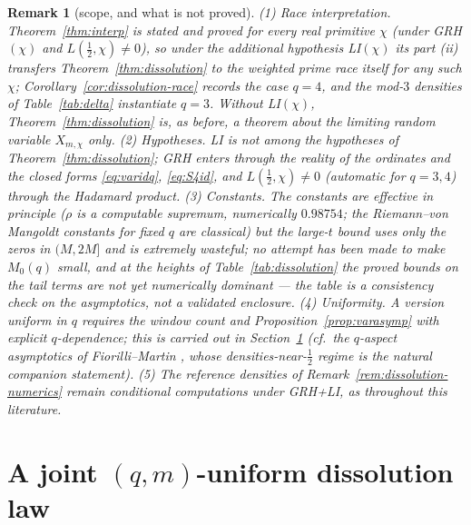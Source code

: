 \documentclass[11pt]{article}
\newtheorem{remark}{Remark}
\begin{document}
\begin{remark}[scope, and what is not proved]\label{rem:dissolution-scope}
(1) \emph{Race interpretation.} Theorem~\ref{thm:interp} is stated
and proved for every real primitive $\chi$ (under GRH$(\chi)$ and
$L(\tfrac12,\chi)\ne0$), so under the additional hypothesis LI$(\chi)$
its part (ii) transfers Theorem~\ref{thm:dissolution} to the weighted
prime race itself for \emph{any} such $\chi$;
Corollary~\ref{cor:dissolution-race} records the case $q=4$, and the
mod-$3$ densities of Table~\ref{tab:delta} instantiate $q=3$. Without
LI$(\chi)$, Theorem~\ref{thm:dissolution} is, as before, a
theorem about the limiting random variable $X_{m,\chi}$ only. (2)
\emph{Hypotheses.} LI is not among the hypotheses of
Theorem~\ref{thm:dissolution}; GRH enters through the reality of the
ordinates and the closed forms \eqref{eq:varidq}, \eqref{eq:S4id},
and $L(\tfrac12,\chi)\ne0$ (automatic for $q=3,4$) through the
Hadamard product. (3) \emph{Constants.} The constants are effective
in principle ($\rho$ is a computable supremum, numerically $0.98754$;
the Riemann--von Mangoldt constants for fixed $q$ are classical) but
the large-$t$ bound uses only the zeros in $(M,2M]$ and is extremely
wasteful; no attempt has been made to make $M_0(q)$ small, and at the
heights of Table~\ref{tab:dissolution} the \emph{proved} bounds on
the tail terms are not yet numerically dominant --- the table is a
consistency check on the asymptotics, not a validated enclosure. (4)
\emph{Uniformity.} A version uniform in $q$ requires the window count
and Proposition~\ref{prop:varasymp} with explicit $q$-dependence;
this is carried out in Section~\ref{sec:joint-dissolution} (cf.\ the
$q$-aspect asymptotics of Fiorilli--Martin \cite{FM13}, whose
densities-near-$\tfrac12$ regime is the natural companion statement). (5) The reference
densities of Remark~\ref{rem:dissolution-numerics} remain
conditional computations under GRH+LI, as throughout this
literature.
\end{remark}


\section{A joint $(q,m)$-uniform dissolution law}
\label{sec:joint-dissolution}
\end{document}
